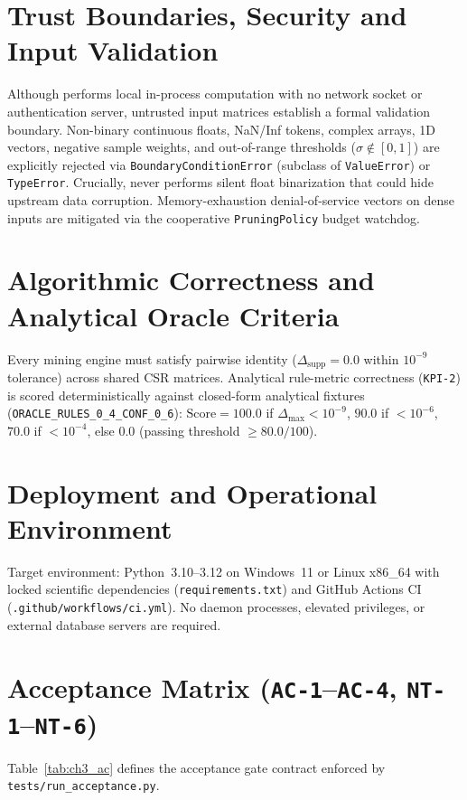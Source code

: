 \section{Trust Boundaries, Security and Input Validation}
Although \skarm performs local in-process computation with no network socket or authentication server, untrusted input matrices establish a formal validation boundary. Non-binary continuous floats, NaN/Inf tokens, complex arrays, 1D vectors, negative sample weights, and out-of-range thresholds ($\sigma \notin [0,1]$) are explicitly rejected via \texttt{Boundary\protect\allowbreak{}Condition\protect\allowbreak{}Error} (subclass of \texttt{ValueError}) or \texttt{TypeError}. Crucially, \skarm never performs silent float binarization that could hide upstream data corruption. Memory-exhaustion denial-of-service vectors on dense inputs are mitigated via the cooperative \texttt{PruningPolicy} budget watchdog.

\section{Algorithmic Correctness and Analytical Oracle Criteria}
Every mining engine must satisfy pairwise identity ($\Delta_{\mathrm{supp}} = 0.0$ within $10^{-9}$ tolerance) across shared CSR matrices. Analytical rule-metric correctness (\texttt{KPI-2}) is scored deterministically against closed-form analytical fixtures (\texttt{ORACLE\_\protect\allowbreak{}RULES\_\protect\allowbreak{}0\_\protect\allowbreak{}4\_\protect\allowbreak{}CONF\_\protect\allowbreak{}0\_\protect\allowbreak{}6}): $\text{Score} = 100.0$ if $\Delta_{\max} < 10^{-9}$, $90.0$ if $< 10^{-6}$, $70.0$ if $< 10^{-4}$, else $0.0$ (passing threshold $\ge 80.0/100$).

\section{Deployment and Operational Environment}
Target environment: Python~3.10--3.12 on Windows~11 or Linux x86\_64 with locked scientific dependencies (\texttt{requirements.txt}) and GitHub Actions CI (\texttt{.github/\protect\allowbreak{}workflows/\protect\allowbreak{}ci.yml}). No daemon processes, elevated privileges, or external database servers are required.

\section{Acceptance Matrix (\texttt{AC-1}--\texttt{AC-4}, \texttt{NT-1}--\texttt{NT-6})}
Table~\ref{tab:ch3_ac} defines the acceptance gate contract enforced by \texttt{tests/run\_\protect\allowbreak{}acceptance.py}.

